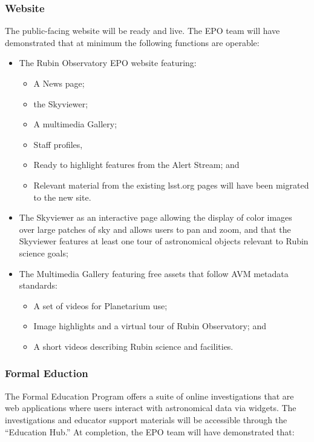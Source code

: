 \subsubsection{Website}

The public-facing website will be ready and live.  The EPO team will have demonstrated that at minimum the following functions are operable:

\begin{itemize} 
	\item The Rubin Observatory EPO website featuring:
	\begin{itemize} 
		\item A News page;
		\item the Skyviewer;
		\item A multimedia Gallery;
		\item Staff profiles,
		\item Ready to highlight features from the Alert Stream; and 
		\item Relevant material from the existing lsst.org pages will have been migrated to the new site.
	\end{itemize}
	\item The Skyviewer as an interactive page allowing the display of color images over  large patches of sky and allows users to pan and zoom, and that the Skyviewer features at least one tour of astronomical objects relevant to Rubin science goals;
	\item The Multimedia Gallery featuring free assets that follow AVM metadata standards: 
	\begin{itemize}
		\item A set of videos for Planetarium use;
		\item Image highlights and a virtual tour of Rubin Observatory; and 
		\item A short videos describing Rubin science and facilities.
	\end{itemize}
\end{itemize}

\subsubsection{Formal Eduction}

The Formal Education Program offers a suite of online investigations that are web applications where users interact with astronomical data via widgets. The investigations and educator support materials will be accessible through the “Education Hub.”   At completion, the EPO team will have demonstrated that:  

